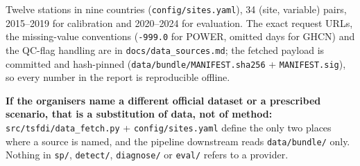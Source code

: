 \documentclass[10pt,a4paper]{article}
\begin{document}
Twelve stations in nine countries (\texttt{config/\allowbreak{}sites.yaml}), 34 (site, variable) pairs, 2015–2019 for calibration and 2020–2024 for evaluation. The exact request URLs, the missing-\allowbreak{}value conventions (\texttt{-\allowbreak{}999.0} for POWER, omitted days for GHCN) and the QC-\allowbreak{}flag handling are in \texttt{docs/\allowbreak{}data\_\allowbreak{}sources.md}; the fetched payload is committed and hash-\allowbreak{}pinned (\texttt{data/\allowbreak{}bundle/\allowbreak{}MANIFEST.sha256} + \texttt{MANIFEST.sig}), so every number in the report is reproducible offline.

\textbf{If the organisers name a different official dataset or a prescribed scenario, that is a substitution of data, not of method:} \texttt{src/\allowbreak{}tsfdi/\allowbreak{}data\_\allowbreak{}fetch.py} + \texttt{config/\allowbreak{}sites.yaml} define the only two places where a source is named, and the pipeline downstream reads \texttt{data/\allowbreak{}bundle/\allowbreak{}} only. Nothing in \texttt{sp/\allowbreak{}}, \texttt{detect/\allowbreak{}}, \texttt{diagnose/\allowbreak{}} or \texttt{eval/\allowbreak{}} refers to a provider.
\end{document}
